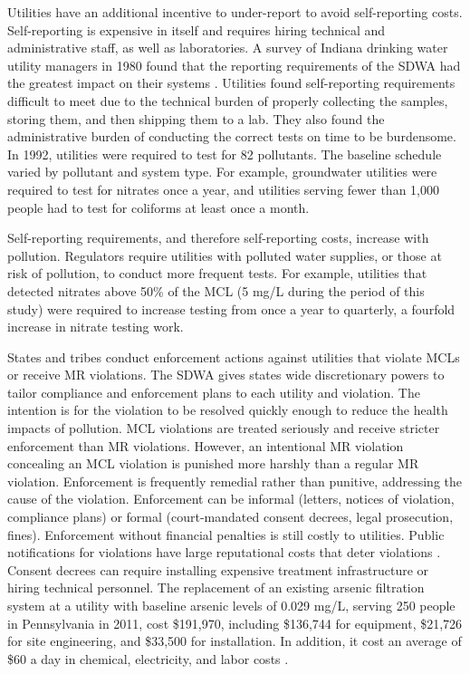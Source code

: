 \documentclass[12pt]{article}
\begin{document}
Utilities have an additional incentive to under-report to avoid self-reporting costs. Self-reporting is expensive in itself and requires hiring technical and administrative staff, as well as laboratories. A survey of Indiana drinking water utility managers in 1980 found that the reporting requirements of the SDWA had the greatest impact on their systems \parencite{oleckno1982national}. Utilities found self-reporting requirements difficult to meet due to the technical burden of properly collecting the samples, storing them, and then shipping them to a lab. They also found the administrative burden of conducting the correct tests on time to be burdensome. In 1992, utilities were required to test for 82 pollutants. The baseline schedule varied by pollutant and system type. For example, groundwater utilities were required to test for nitrates once a year, and utilities serving fewer than 1,000 people had to test for coliforms at least once a month. 

Self-reporting requirements, and therefore self-reporting costs, increase with pollution. Regulators require utilities with polluted water supplies, or those at risk of pollution, to conduct more frequent tests. For example, utilities that detected nitrates above 50\% of the MCL (5 mg/L during the period of this study) were required to increase testing from once a year to quarterly, a fourfold increase in nitrate testing work. 


States and tribes conduct enforcement actions against utilities that violate MCLs or receive MR violations. The SDWA gives states wide discretionary powers to tailor compliance and enforcement plans to each utility and violation. The intention is for the violation to be resolved quickly enough to reduce the health impacts of pollution. MCL violations are treated seriously and receive stricter enforcement than MR violations. However, an intentional MR violation concealing an MCL violation is punished more harshly than a regular MR violation. Enforcement is frequently remedial rather than punitive, addressing the cause of the violation. Enforcement can be informal (letters, notices of violation, compliance plans) or formal (court-mandated consent decrees, legal prosecution, fines). Enforcement without financial penalties is still costly to utilities. Public notifications for violations have large reputational costs that deter violations \parencite{bennear2008impacts}. Consent decrees can require installing expensive treatment infrastructure or hiring technical personnel. The replacement of an existing arsenic filtration system at a utility with baseline arsenic levels of 0.029 mg/L, serving 250 people in Pennsylvania in 2011, cost \$191,970, including \$136,744 for equipment, \$21,726 for site engineering, and \$33,500 for installation. In addition, it cost an average of \$60 a day in chemical, electricity, and labor costs \parencite{epaarsenicbat}.
\end{document}
